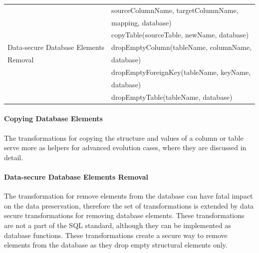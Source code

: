 \documentclass[runningheads]{comsis}
\begin{document}
\begin{table}
\begin{tabular}{ll}
	& \hspace{0.5in} sourceColumnName, targetColumnName, \\ 
	& \hspace{0.5in} mapping, database) \\
	& copyTable(sourceTable, newName, database) \\
	Data-secure Database Elements &
	dropEmptyColumn(tableName, columnName, \\
	Removal & \hspace{0.25in} database) \\
	& dropEmptyForeignKey(tableName, keyName, \\ & \hspace{0.25in} database) \\
	& dropEmptyTable(tableName, database) \\
	\hline
	\end{tabular}
\end{table}

\paragraph{Copying Database Elements} The transformations for copying the structure and values of a column or table serve more as helpers for advanced evolution cases, where they are discussed in detail.


\paragraph{Data-secure Database Elements Removal} The transformation for remove elements from the database can have fatal impact on the data preservation, therefore the set of transformations is extended by data secure transformations for removing database elements. These transformations are not a part of the SQL standard, although they can be implemented as database functions. These transformations create a secure way to remove elements from the database as they drop empty structural elements only. 
\end{document}
